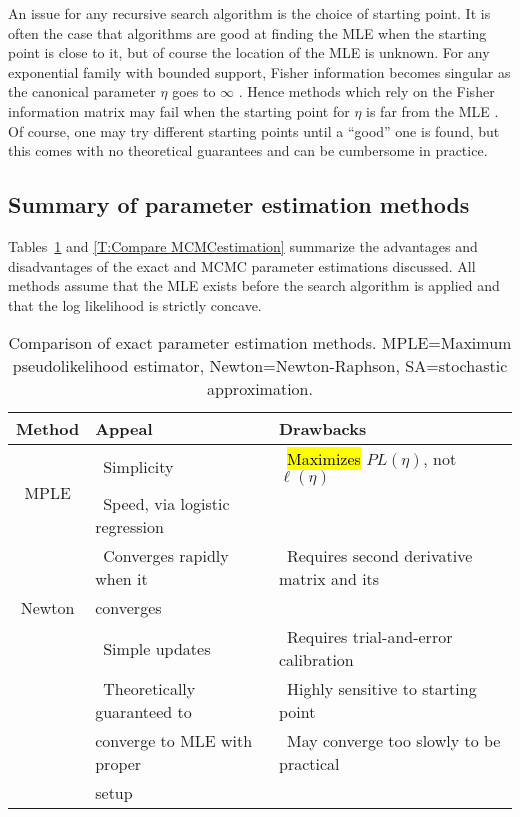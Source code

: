 An issue for any recursive search algorithm is the 
choice of starting point.  It is 
often the case that algorithms are good at finding the MLE when the starting point is 
close to it, but of course the 
location of the MLE is unknown.  For any exponential family with bounded support, 
Fisher information 
becomes singular as the canonical parameter $\eta$ goes to $\infty$ \citep*{Rinaldo:2009}.
Hence methods which rely on 
the Fisher information matrix may fail when the starting point for $\eta$ is far from 
the MLE \citep{Younes:1989,Gu:2001}.
Of course, one may try different starting points until a ``good'' one is found, but 
this comes with no theoretical guarantees and can be cumbersome in practice.

\subsection{Summary of parameter estimation methods}
Tables~\ref{T:Compare estimation} and \ref{T:Compare MCMCestimation} summarize the advantages and disadvantages of the exact and MCMC parameter estimations discussed.  
All methods assume that the MLE exists before the search algorithm is applied and that
the log likelihood is strictly concave.

\begin{table}[h!] 
\caption[Comparison of exact parameter estimation methods]{Comparison of exact parameter estimation methods. MPLE=Maximum pseudolikelihood estimator, Newton=Newton-Raphson,
SA=stochastic approximation.\\}

\begin{tabular}{|c|l|l|}
\hline 
Method & Appeal & Drawbacks \\ [1ex]
\hline
\multirow{2}{0.5in}{MPLE}		
& 	\textbullet \, Simplicity 				  	& \textbullet \, \hl{Maximizes} $PL(\eta)$, not $\ell(\eta)$  \\
& 	\textbullet \, Speed, via logistic regression 	& \\ [1ex] %
\hline
\multirow{3}{0.5in}{Newton}
& 	\textbullet \, Converges rapidly when it & \textbullet \, Requires second derivative matrix and its\\	
& 	converges 	&  \\ [1ex] 
\hline
\multirow{3}{0.5in}{SA} 		
& 	\textbullet \, Simple updates 				& \textbullet \, Requires trial-and-error calibration  \\			& 	\textbullet \, Theoretically guaranteed to		& \textbullet \, Highly sensitive to starting point \\
& 	converge to MLE with proper  & \textbullet \,  May converge too slowly to be practical \\
& 	setup  & \\[1ex]
\hline 
\end{tabular} 
\label{T:Compare estimation}
\end{table}

